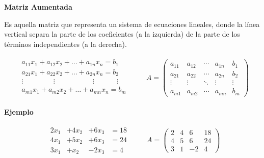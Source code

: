 \documentclass{article}
\begin{document}
\begin{large}
    \textbf{Matriz Aumentada}
\end{large}

Es aquella matriz que representa un sistema de ecuaciones lineales, donde la línea vertical separa la parte de los coeficientes (a la izquierda) de la parte de los términos independientes (a la derecha).

\begin{equation*}
    \begin{matrix}
        \begin{aligned}
            a_{11}x_1 + a_{12}x_2 + \dots + a_{1n}x_n = b_1\\
            a_{21}x_1 + a_{22}x_2 + \dots + a_{2n}x_n = b_2\\
            \vdots \phantom{aaaaaaaa} \vdots \phantom{aaaaaaaaaa} \vdots \phantom{aaaaaa} \vdots\\
            a_{m1}x_1 + a_{m2}x_2 + \dots + a_{mn}x_n = b_m\\
        \end{aligned}
    \end{matrix}
    \quad \quad A = \left(\begin{array}{cccc|c}
        a_{11} & a_{12} & \dotsb & a_{1n} & b_1\\
        a_{21} & a_{22} & \dotsb & a_{2n} & b_2\\
        \vdots & \vdots & \ddots & \vdots & \vdots\\
        a_{m1} & a_{m2} & \dotsb & a_{mn} & b_m
    \end{array}\right)
\end{equation*}

\begin{large}
    \textbf{Ejemplo}
\end{large}

\begin{equation*}
    \begin{matrix}
        \begin{array}{rrrr}
            2x_1 &+ 4x_2 &+ 6x_3 &=18\\
            4x_1 &+ 5x_2 &+ 6x_3 &=24\\
            3x_1 &+ x_2  &- 2x_3 &=4            
        \end{array}
    \end{matrix}
    \quad \quad A = \left(\begin{array}{rrr|r}
        2 & 4 & 6 & 18\\
        4 & 5 & 6 & 24\\
        3 & 1 & -2& 4
    \end{array}\right)
\end{equation*}
\end{document}
